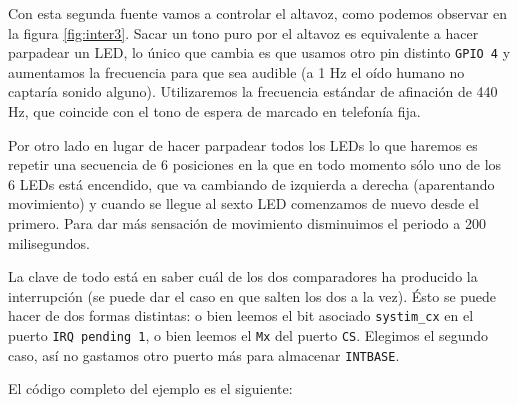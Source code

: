 Con esta segunda fuente vamos a controlar el altavoz, como podemos
observar en la figura \ref{fig:inter3}. Sacar un tono
puro por el altavoz es equivalente a hacer parpadear un LED, lo único que cambia es que usamos
otro pin distinto {\tt GPIO 4} y aumentamos la frecuencia para que sea audible (a 1 Hz el oído
humano no captaría sonido alguno). Utilizaremos la frecuencia estándar de afinación
de 440 Hz, que coincide con el tono de espera de marcado en telefonía fija.

Por otro lado en lugar de hacer parpadear todos los LEDs lo que haremos es repetir una
secuencia de 6 posiciones en la que en todo momento sólo uno de los 6 LEDs está encendido, que
va cambiando de izquierda a derecha (aparentando movimiento) y cuando se llegue al sexto LED
comenzamos de nuevo desde el primero. Para dar más sensación de movimiento disminuimos el periodo
a 200 milisegundos.

La clave de todo está en saber cuál de los dos comparadores ha producido la interrupción (se
puede dar el caso en que salten los dos a la vez). Ésto se puede hacer de dos formas distintas:
o bien leemos el bit asociado {\tt systim\_cx} en el puerto {\tt IRQ pending 1}, o bien leemos
el {\tt Mx} del puerto {\tt CS}. Elegimos el segundo caso, así no gastamos otro puerto más
para almacenar {\tt INTBASE}.

El código completo del ejemplo es el siguiente:

